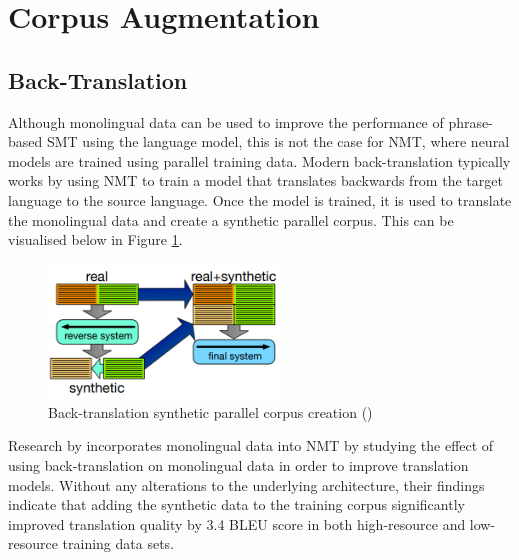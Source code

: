 






\clearpage

\section{Corpus Augmentation}

\subsection{Back-Translation}
Although monolingual data can be used to improve the performance of phrase-based \acrfull{SMT} using the language model, this is not the case for \acrshort{NMT}, where neural models are trained using parallel training data. Modern back-translation typically works by using \acrshort{NMT} to train a model that translates backwards from the target language to the source language. Once the model is trained, it is used to translate the monolingual data and create a synthetic parallel corpus. This can be visualised below in Figure \ref{fig:back_trans}.

\begin{figure}[ht!]
\centering
\includegraphics[width=0.55\textwidth]{media/literature/data_argumentation/da_back_trans.png}
\caption[Diagram of the back-translation synthetic parallel corpus]{Back-translation synthetic parallel corpus creation (\cite{hoang_iterative_2018})}
\label{fig:back_trans}
\end{figure}
Research by \cite{sennrich_improving_2016} incorporates monolingual data into \acrshort{NMT} by studying the effect of using back-translation on monolingual data in order to improve translation models.  Without any alterations to the underlying architecture, their findings indicate that adding the synthetic data to the training corpus significantly improved translation quality by 3.4 BLEU score in both high-resource and low-resource training data sets.



